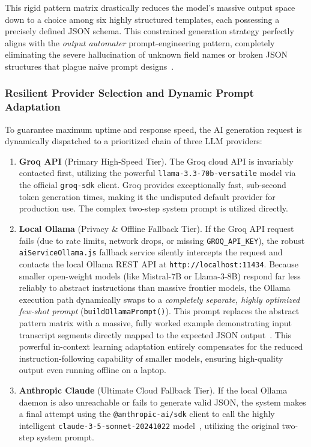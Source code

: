 This rigid pattern matrix drastically reduces the model's massive output space down to a choice among six highly structured templates, each possessing a precisely defined JSON schema. This constrained generation strategy perfectly aligns with the \emph{output automater} prompt-engineering pattern, completely eliminating the severe hallucination of unknown field names or broken JSON structures that plague naive prompt designs~\cite{white2023}.

\subsubsection{Resilient Provider Selection and Dynamic Prompt Adaptation}

To guarantee maximum uptime and response speed, the AI generation request is dynamically dispatched to a prioritized chain of three LLM providers:

\begin{enumerate}
  \item \textbf{Groq API} (Primary High-Speed Tier). The Groq cloud API is invariably contacted first, utilizing the powerful \texttt{llama-3.3-70b-versatile} model via the official \texttt{groq-sdk} client. Groq provides exceptionally fast, sub-second token generation times, making it the undisputed default provider for production use. The complex two-step system prompt is utilized directly.
  \item \textbf{Local Ollama} (Privacy \& Offline Fallback Tier). If the Groq API request fails (due to rate limits, network drops, or missing \texttt{GROQ\_API\_KEY}), the robust \texttt{aiServiceOllama.js} fallback service silently intercepts the request and contacts the local Ollama REST API at \texttt{http://localhost:11434}. Because smaller open-weight models (like Mistral-7B or Llama-3-8B) respond far less reliably to abstract instructions than massive frontier models, the Ollama execution path dynamically swaps to a \emph{completely separate, highly optimized few-shot prompt} (\texttt{buildOllamaPrompt()}). This prompt replaces the abstract pattern matrix with a massive, fully worked example demonstrating input transcript segments directly mapped to the expected JSON output~\cite{brown2020}. This powerful in-context learning adaptation entirely compensates for the reduced instruction-following capability of smaller models, ensuring high-quality output even running offline on a laptop.
  \item \textbf{Anthropic Claude} (Ultimate Cloud Fallback Tier). If the local Ollama daemon is also unreachable or fails to generate valid JSON, the system makes a final attempt using the \texttt{@anthropic-ai/sdk} client to call the highly intelligent \texttt{claude-3-5-sonnet-20241022} model~\cite{anthropic2024}, utilizing the original two-step system prompt.
\end{enumerate}

